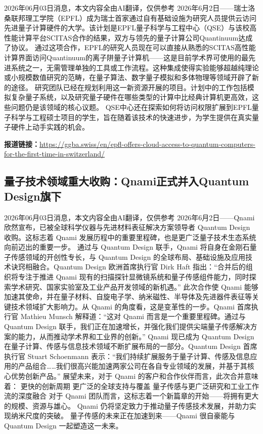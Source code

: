 \documentclass[12pt,a4paper]{ctexart}
\begin{document}
2026年06月03日消息，本文内容全由AI翻译，仅供参考
2026年6月2日——瑞士洛桑联邦理工学院（EPFL）成为瑞士首家通过自有基础设施为研究人员提供云访问先进量子计算硬件的大学。该计划是EPFL量子科学与工程中心（QSE）与该校高性能计算平台SCITAS合作的结果，双方与领先的量子计算公司Quantinuum达成了协议。
通过这项合作，EPFL的研究人员现在可以直接从熟悉的SCITAS高性能计算界面访问Quantinuum的离子阱量子计算机——这是目前学术界可使用的最先进系统之一，无需管理单独的工具或工作流程。这种集成使得实验能够超越纯理论或小规模数值研究的范畴，在量子算法、数字量子模拟和多体物理等领域开辟了新的途径。
研究团队已经在规划利用这一新资源开展的项目。计划中的工作包括模拟复杂量子系统，以及研究量子硬件在哪些类型的计算中比经典计算机更高效，这些问题仍是该领域的核心议题。
QSE中心还在探索如何将访问权限扩展到EPFL量子科学与工程硕士项目的学生，旨在随着该技术的快速进步，为学生提供在真实量子硬件上动手实践的机会。

\noindent\textbf{报道链接：}\url{https://ggba.swiss/en/epfl-offers-cloud-access-to-quantum-computers-for-the-first-time-in-switzerland/}

\subsection{ 量子技术领域重大收购：Qnami正式并入Quantum Design旗下 }

2026年06月03日消息，本文内容全由AI翻译，仅供参考
2026年6月2日——Qnami 欣然宣布，已被全球科学仪器与先进材料表征解决方案领导者 Quantum Design 收购。这标志着 Qnami 发展历程中的重要里程碑，也是更广泛量子技术生态系统向前迈出的重要一步。
通过与 Quantum Design 联手，Qnami 将自身在金刚石量子传感领域的开创性专长，与 Quantum Design 的全球布局、基础设施及应用技术诀窍相融合。Quantum Design 欧洲首席执行官 Dirk Haft 指出：“合并后的组织将专注于推进 Qnami 现有的扫描探针显微镜系统和量子传感组件能力，同时探索学术研究、国家实验室及工业产品开发领域的新机遇。”
此次合作使 Qnami 能够加速其使命，并在量子材料、自旋电子学、纳米磁性、半导体及先进器件表征等关键技术领域扩大影响力。从 Qnami 的角度看，这是变革性的一步。Qnami 首席执行官 Mathieu Munsch 解释道：“这对 Qnami 而言是一个重要里程碑。通过与 Quantum Design 联手，我们正在加速增长，并强化我们提供尖端量子传感解决方案的能力，从而推动学术界和工业界的创新。”
Qnami 现已成为 Quantum Design 在量子计算、传感与信息技术领域不断扩展布局的一部分。Quantum Design 首席执行官 Stuart Schoenmann 表示：“我们持续扩展服务于量子计算、传感及信息应用的产品组合……我们很高兴能加速两家公司在各自专业领域的发展，并基于其核心优势创新产品。”
展望未来，对于 Qnami 的客户和合作伙伴而言，此次合并意味着：
更快的创新周期
更广泛的全球支持与覆盖
量子传感与更广泛研究和工业工作流的深度融合
对于 Qnami 团队而言，这标志着一个新篇章的开始——将拥有更大的规模、资源与雄心。
Qnami 仍将坚定致力于推动量子传感技术发展，并助力实现纳米尺度的突破。
量子传感的未来正在加速到来——Qnami 很自豪能与 Quantum Design 一起塑造这一未来。
\end{document}

